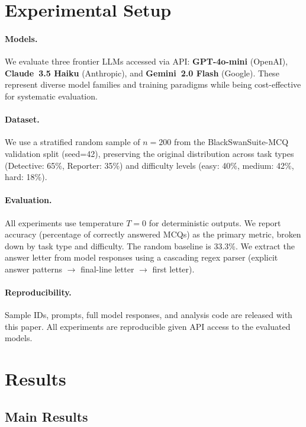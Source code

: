 \documentclass[10pt,twocolumn,letterpaper]{article}
\begin{document}
\section{Experimental Setup}
\label{sec:setup}

\paragraph{Models.} We evaluate three frontier LLMs accessed via API: \textbf{GPT-4o-mini} (OpenAI), \textbf{Claude~3.5 Haiku} (Anthropic), and \textbf{Gemini~2.0 Flash} (Google). These represent diverse model families and training paradigms while being cost-effective for systematic evaluation.

\paragraph{Dataset.} We use a stratified random sample of $n=200$ from the BlackSwanSuite-MCQ validation split (seed=42), preserving the original distribution across task types (Detective: 65\%, Reporter: 35\%) and difficulty levels (easy: 40\%, medium: 42\%, hard: 18\%).

\paragraph{Evaluation.} All experiments use temperature $T=0$ for deterministic outputs. We report accuracy (percentage of correctly answered MCQs) as the primary metric, broken down by task type and difficulty. The random baseline is 33.3\%. We extract the answer letter from model responses using a cascading regex parser (explicit answer patterns $\to$ final-line letter $\to$ first letter).

\paragraph{Reproducibility.} Sample IDs, prompts, full model responses, and analysis code are released with this paper. All experiments are reproducible given API access to the evaluated models.

\section{Results}
\label{sec:results}

\subsection{Main Results}
\end{document}

